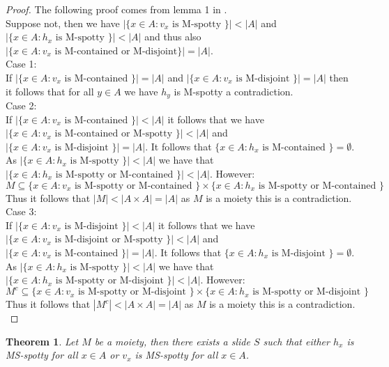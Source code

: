 \documentclass{report}
\newtheorem{theorem}{Theorem}[section]
\begin{document}
\begin{proof}
The following proof comes from lemma 1 in \cite{shuffle2}.\\
Suppose not, then we have \(|\{x\in A:v_x \text{ is M-spotty }\}|<|A| \) and \(|\{x\in A:h_x \text{ is M-spotty }\}|<|A| \) and thus also \(|\{x\in A: v_x \text{ is M-contained or M-disjoint}\}|=|A|\).\\
Case 1:\\
If \(|\{x\in A:v_x  \text{ is M-contained }\}|=|A|\) and \(|\{x\in A: v_x \text{ is M-disjoint }\}|=|A|\) then it follows that for all \(y \in A\) we have \(h_y\) is M-spotty a contradiction.\\
Case 2:\\
If \(|\{x\in A:v_x  \text{ is M-contained }\}|<|A|\) it follows that we have \(|\{x\in A:v_x  \text{ is M-contained or M-spotty }\}|<|A|\) and \(|\{x\in A:v_x  \text{ is M-disjoint }\}|=|A|\). It follows that \(\{x\in A: h_x \text{ is M-contained }\} = \emptyset\). As \(|\{x\in A:h_x \text{ is M-spotty }\}|<|A| \) we have that \(|\{x\in A:h_x \text{ is M-spotty or M-contained }\}|<|A| \). However:
 \[M \subseteq \{x\in A:v_x \text{ is M-spotty or M-contained }\}\times\{x\in A:h_x \text{ is M-spotty or M-contained }\}\]
Thus it follows that \(|M|<|A\times A|=|A|\) as \(M\) is a moiety this is a contradiction.\\
Case 3:\\
If \(|\{x\in A:v_x  \text{ is M-disjoint }\}|<|A|\) it follows that we have \(|\{x\in A:v_x  \text{ is M-disjoint or M-spotty }\}|<|A|\) and \(|\{x\in A:v_x  \text{ is M-contained }\}|=|A|\). It follows that \(\{x\in A: h_x \text{ is M-disjoint }\} = \emptyset\). As \(|\{x\in A:h_x \text{ is M-spotty }\}|<|A| \) we have that \(|\{x\in A:h_x \text{ is M-spotty or M-disjoint }\}|<|A| \). However:
 \[M^c \subseteq \{x\in A:v_x \text{ is M-spotty or M-disjoint }\}\times\{x\in A:h_x \text{ is M-spotty or M-disjoint }\}\]
Thus it follows that \(|M^c|<|A\times A|=|A|\) as \(M\) is a moiety this is a contradiction.\\
\end{proof}
\begin{theorem}\label{Soon to be all spots}
Let \(M\) be a moiety, then there exists a slide \(S\) such that either \(h_x\) is MS-spotty for all \(x\in A\) or \(v_x\) is MS-spotty for all \(x\in A\).
\end{theorem}
\end{document}
